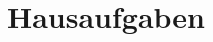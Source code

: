 \documentclass[10pt,handout]{beamer}
\begin{document}


\section{Hausaufgaben}





\begin{frame}
\textcolor{white}{
\ea\label{ex:03aHA2}
\ex\label{ex:03aHA3}
\ex\label{ex:03aHA4}
\z
}
\end{frame}
\end{document}
